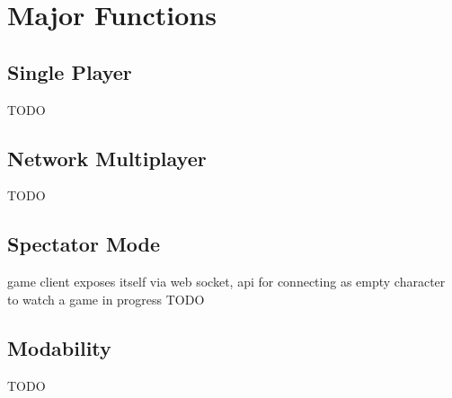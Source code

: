 \section{Major Functions} \label{sec:productfunctions}


\subsection{Single Player}
TODO

\subsection{Network Multiplayer}
TODO

\subsection{Spectator Mode}
game client exposes itself via web socket, api for connecting as empty character
to watch a game in progress
TODO

\subsection{Modability}
TODO

 
